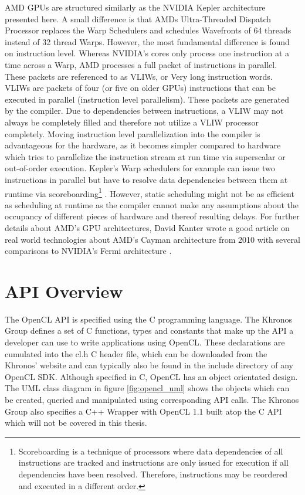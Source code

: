 AMD GPUs are structured similarly as the NVIDIA Kepler architecture presented here. A small difference is that AMDs Ultra-Threaded Dispatch Processor replaces the Warp Schedulers and schedules Wavefronts of 64 threads instead of 32 thread Warps. However, the most fundamental difference is found on instruction level. Whereas NVIDIA's cores only process one instruction at a time across a Warp, AMD processes a full packet of instructions in parallel. These packets are referenced to as VLIWs, or Very long instruction words. VLIWs are packets of four (or five on older GPUs) instructions that can be executed in parallel (instruction level parallelism). These packets are generated by the compiler. Due to dependencies between instructions, a VLIW may not always be completely filled and therefore not utilize a VLIW processor completely. Moving instruction level parallelization into the compiler is advantageous for the hardware, as it becomes simpler compared to hardware which tries to parallelize the instruction stream at run time via superscalar or out-of-order execution. Kepler's Warp schedulers for example can issue two instructions in parallel but have to resolve data dependencies between them at runtime via scoreboarding\footnote{Scoreboarding is a technique of processors where data dependencies of all instructions are tracked and instructions are only issued for execution if all dependencies have been resolved. Therefore, instructions may be reordered and executed in a different order.} \cite[p.4]{cayman_arch}. However, static scheduling might not be as efficient as scheduling at runtime as the compiler cannot make any assumptions about the occupancy of different pieces of hardware and thereof resulting delays. For further details about AMD's GPU architectures, David Kanter wrote a good article on real world technologies about AMD's Cayman architecture from 2010 with several comparisons to NVIDIA's Fermi architecture \cite{cayman_arch}.

\section{API Overview}

The OpenCL API is specified using the C programming language. The Khronos Group defines a set of C functions, types and constants that make up the API a developer can use to write applications using OpenCL. These declarations are cumulated into the cl.h C header file, which can be downloaded from the Khronos' website and can typically also be found in the include directory of any OpenCL SDK. Although specified in C, OpenCL has an object orientated design. The UML class diagram in figure \ref{fig:opencl_uml} shows the objects which can be created, queried and manipulated using corresponding API calls. The Khronos Group also specifies a C++ Wrapper with OpenCL 1.1 built atop the C API which will not be covered in this thesis.

